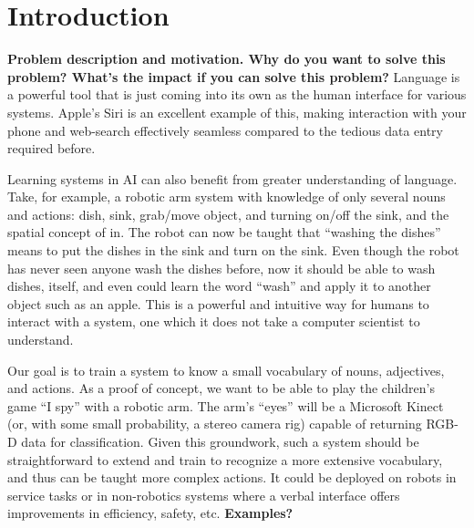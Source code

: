 \documentclass[11pt]{article}
\title{\xxx{Paper Title Here}}
\author{Rob Goeddel \and Lauren Hinkle \and James Kirk \and Aaron Mininger}
\date{}
\newcommand{\xxx}[1]{{\bf \color{red} #1}}
\begin{document}
\maketitle

\begin{abstract}
\xxx{Abstract goes here, 1 par. max}
Dijkstra was a cool guy and it's fun to cite his papers~\cite{dijkstra1959}.
\end{abstract}

\section{Introduction}
\xxx{Problem description and motivation. Why do you want to solve this
    problem? What's the impact if you can solve this problem?}
Language is a powerful tool that is just coming into its own as the human
interface for various systems. Apple's Siri is an excellent example of this,
making interaction with your phone and web-search effectively seamless
compared to the tedious data entry required before.

Learning systems in AI can also benefit from greater understanding of
language. Take, for example, a robotic arm system with knowledge of only
several nouns and actions: dish, sink, grab/move object, and turning on/off
the sink, and the spatial concept of in. The robot can now be taught that
``washing the dishes'' means to put the dishes in the sink and turn on the
sink. Even though the robot has never seen anyone wash the dishes before, now
it should be able to wash dishes, itself, and even could learn the word
``wash'' and apply it to another object such as an apple. This is a powerful
and intuitive way for humans to interact with a system, one which it does not
take a computer scientist to understand.

Our goal is to train a system to know a small vocabulary of nouns, adjectives,
and actions. As a proof of concept, we want to be able to play the children's
game ``I spy'' with a robotic arm. The arm's ``eyes'' will be a Microsoft
Kinect (or, with some small probability, a stereo camera rig) capable of
returning RGB-D data for classification. Given this groundwork, such a system
should be straightforward to extend and train to recognize a more extensive
vocabulary, and thus can be taught more complex actions. It could be deployed
on robots in service tasks or in non-robotics systems where a verbal interface
offers improvements in efficiency, safety, etc. \xxx{Examples?}
\end{document}
